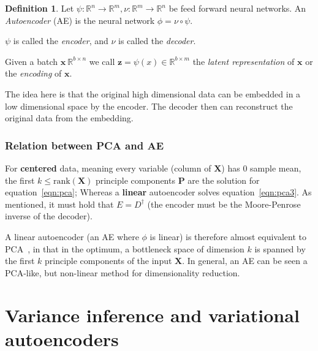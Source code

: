 \documentclass[11pt, a4paper]{report}
\theoremstyle{plain}
\theoremstyle{definition}
\newtheorem{mydef}{Definition}[chapter]
\theoremstyle{remark}
\newcommand{\R}{\mathbb{R}}
\newcommand{\x}{\mathbf{x}}
\newcommand{\z}{\mathbf{z}}
\newcommand{\bv}[1]{\boldsymbol{#1}}
\begin{document}
\begin{mydef}
\label{def:autoencoder}
Let $\psi : \R^n \to \R^m, \nu : \R^m \to \R^n$ be feed forward neural networks.
An \textit{Autoencoder} (AE) is the neural network $\phi = \nu \circ \psi$.  

$\psi$ is called the \emph{encoder}, and $\nu$ is called the \emph{decoder}.

Given a batch $\x \ \R^{b \times n}$ we call $\z = \psi(x) \in \R^{b \times m}$
the \emph{latent representation} of $\x$ or the \emph{encoding} of $\x$.
\end{mydef}

The idea here is that the original high dimensional data can be embedded
in a low dimensional space by the encoder. The decoder then can reconstruct the
original data from the embedding.



\subsection{Relation between PCA and AE}
For \textbf{centered} data, meaning every variable (column of $\bv{X}$)
has $0$ sample mean, the first $k \leq \text{rank}(\bv{X})$ principle components
$\bv{P}$ are the solution for equation~\ref{eqn:pca}; Whereas a \textbf{linear}
autoencoder solves equation~\ref{eqn:pca3}. As mentioned, it must hold that $E =
D^{\dagger}$ (the encoder must be the Moore-Penrose inverse of the decoder).

A linear autoencoder (an AE where $\phi$ is linear) is therefore almost equivalent to
PCA~\cite{plaut2018principal}, in that in the optimum, a bottleneck space of dimension $k$
is spanned by the first $k$ principle components of the input $\bv{X}$.
In general, an AE can be seen a PCA-like, but non-linear method for
dimensionality reduction.

\chapter{Variance inference and variational autoencoders}
\end{document}
